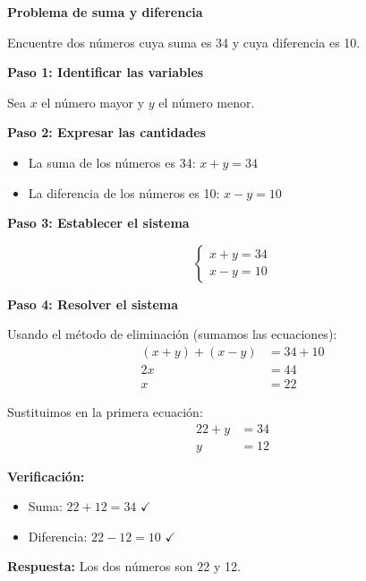 \begin{example}
\textbf{Problema de suma y diferencia}

Encuentre dos números cuya suma es 34 y cuya diferencia es 10.

\textbf{Paso 1: Identificar las variables}

Sea $x$ el número mayor y $y$ el número menor.

\textbf{Paso 2: Expresar las cantidades}

\begin{itemize}
    \item La suma de los números es 34: $x + y = 34$
    \item La diferencia de los números es 10: $x - y = 10$
\end{itemize}

\textbf{Paso 3: Establecer el sistema}

$$\begin{cases}
x + y = 34 \\
x - y = 10
\end{cases}$$

\textbf{Paso 4: Resolver el sistema}

Usando el método de eliminación (sumamos las ecuaciones):
\begin{align*}
(x + y) + (x - y) &= 34 + 10 \\
2x &= 44 \\
x &= 22
\end{align*}

Sustituimos en la primera ecuación:
\begin{align*}
22 + y &= 34 \\
y &= 12
\end{align*}

\textbf{Verificación:}
\begin{itemize}
    \item Suma: $22 + 12 = 34$ \quad $\checkmark$
    \item Diferencia: $22 - 12 = 10$ \quad $\checkmark$
\end{itemize}

\textbf{Respuesta:} Los dos números son 22 y 12.
\end{example}

